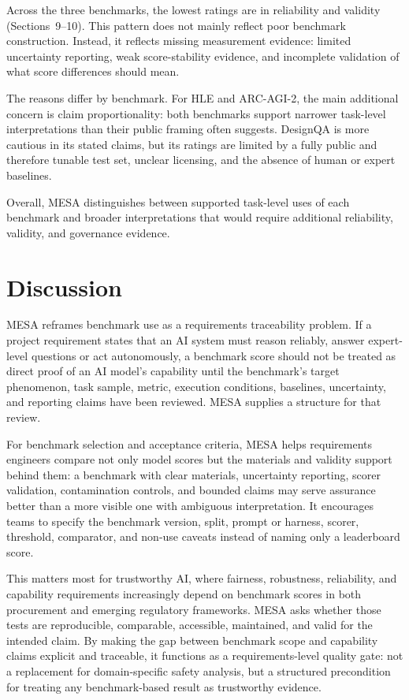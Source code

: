 \documentclass[conference]{IEEEtran}
\begin{document}
        Across the three benchmarks, the lowest ratings are in reliability and validity (Sections~9--10). This pattern does not mainly reflect poor benchmark construction. Instead, it reflects missing measurement evidence: limited uncertainty reporting, weak score-stability evidence, and incomplete validation of what score differences should mean.
        
        The reasons differ by benchmark. For HLE and ARC-AGI-2, the main additional concern is claim proportionality: both benchmarks support narrower task-level interpretations than their public framing often suggests. DesignQA is more cautious in its stated claims, but its ratings are limited by a fully public and therefore tunable test set, unclear licensing, and the absence of human or expert baselines.
        
        Overall, MESA distinguishes between supported task-level uses of each benchmark and broader interpretations that would require additional reliability, validity, and governance evidence.

\section{Discussion}

    MESA reframes benchmark use as a requirements traceability problem. If a project requirement states that an AI system must reason reliably, answer expert-level questions or act autonomously, a benchmark score should not be treated as direct proof of an AI model's capability until the benchmark's target phenomenon, task sample, metric, execution conditions, baselines, uncertainty, and reporting claims have been reviewed. MESA supplies a structure for that review.
    
    For benchmark selection and acceptance criteria, MESA helps requirements engineers compare not only model scores but the materials and validity support behind them: a benchmark with clear materials, uncertainty reporting, scorer validation, contamination controls, and bounded claims may serve assurance better than a more visible one with ambiguous interpretation. It encourages teams to specify the benchmark version, split, prompt or harness, scorer, threshold, comparator, and non-use caveats instead of naming only a leaderboard score.
    
    This matters most for trustworthy AI, where fairness, robustness, reliability, and capability requirements increasingly depend on benchmark scores in both procurement and emerging regulatory frameworks. MESA asks whether those tests are reproducible, comparable, accessible, maintained, and valid for the intended claim. By making the gap between benchmark scope and capability claims explicit and traceable, it functions as a requirements-level quality gate: not a replacement for domain-specific safety analysis, but a structured precondition for treating any benchmark-based result as trustworthy evidence.
    
\end{document}
